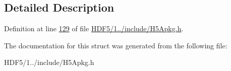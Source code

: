 \subsection{Detailed Description}


Definition at line \hyperlink{_h_d_f5_21_810_81_2include_2_h5_apkg_8h_source_l00129}{129} of file \hyperlink{_h_d_f5_21_810_81_2include_2_h5_apkg_8h_source}{H\+D\+F5/1../include/\+H5\+Apkg.\+h}.



The documentation for this struct was generated from the following file\+:\begin{DoxyCompactItemize}
\item 
H\+D\+F5/1../include/\+H5\+Apkg.\+h\end{DoxyCompactItemize}
